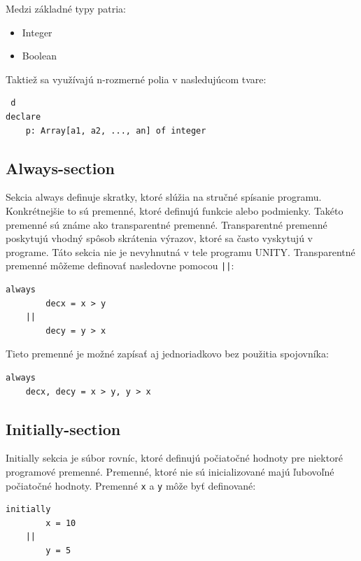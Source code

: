 Medzi základné typy patria:
\begin{itemize}
	\item Integer
	\item Boolean
\end{itemize}

\vspace{5mm}



\vspace{5mm}

Taktiež sa využívajú n-rozmerné polia v nasledujúcom tvare:
\begin{lstlisting} d
declare 
	p: Array[a1, a2, ..., an] of integer
\end{lstlisting}

\subsection{Always-section}

Sekcia always definuje skratky, ktoré slúžia na stručné spísanie programu. 
Konkrétnejšie to sú premenné, ktoré definujú funkcie alebo podmienky. 
Takéto premenné sú známe ako transparentné premenné. 
Transparentné premenné poskytujú vhodný spôsob skrátenia výrazov, ktoré sa často vyskytujú v programe. 
Táto sekcia nie je nevyhnutná v tele programu UNITY. Transparentné premenné môžeme definovať nasledovne pomocou \texttt{||}:

\begin{lstlisting}
always
		decx = x > y
	||
		decy = y > x
\end{lstlisting}

Tieto premenné je možné zapísať aj jednoriadkovo bez použitia spojovníka:

\begin{lstlisting}
always
	decx, decy = x > y, y > x
\end{lstlisting}

\subsection{Initially-section}

Initially sekcia je súbor rovníc, ktoré definujú počiatočné hodnoty pre niektoré programové premenné. 
Premenné, ktoré nie sú inicializované majú ľubovoľné počiatočné hodnoty. Premenné \texttt{x} a \texttt{y} 
môže byť definované:

\begin{lstlisting}
initially
		x = 10
	||
		y = 5
\end{lstlisting}

